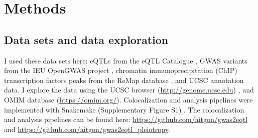 

%
%
%
%

\section*{Methods}\label{sec:methods}

\subsection*{Data sets and data exploration}

I used these data sets here: eQTLs from the eQTL Catalogue \citep{2021.Alasoo.Kerimov}, GWAS variants from the IEU OpenGWAS project \citep{2021.Marcora.Lyon}, chromatin immunoprecipitation (ChIP) transcription factors peaks from the ReMap database \citep{2021.Ballester.Hammal}, and UCSC annotation data.
%
I explore the data using the UCSC browser (\url{http://genome.ucsc.edu}) \citep{2021.Kent.Lee}, and OMIM database (\url{https://omim.org/}).
%
Colocalization and analysis pipelines were implemented with Snakemake (Supplementary Figure S1) .
%
The colocalization and analysis pipelines can be found here: \url{https://github.com/aitgon/gwas2eqtl} and \url{https://github.com/aitgon/gwas2eqtl_pleiotropy}.

